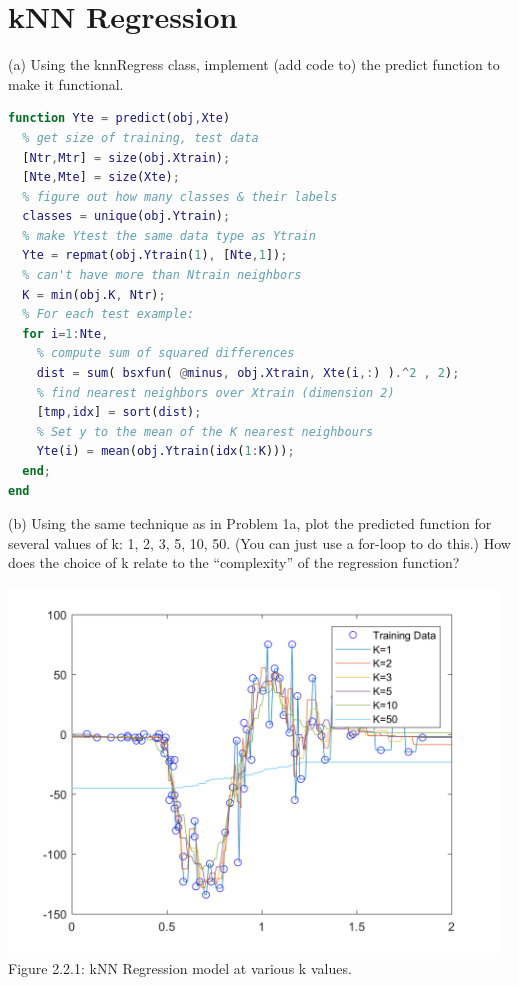 \documentclass[]{report}   %
\begin{document}
\section{kNN Regression}
(a) Using the knnRegress class, implement (add code to) the predict function to make it functional.
\begin{lstlisting}[language=Matlab, caption=predict() Implementation]
% Test function: predict on Xtest
function Yte = predict(obj,Xte)
  % get size of training, test data
  [Ntr,Mtr] = size(obj.Xtrain);
  [Nte,Mte] = size(Xte);
  % figure out how many classes & their labels
  classes = unique(obj.Ytrain);        
  % make Ytest the same data type as Ytrain  
  Yte = repmat(obj.Ytrain(1), [Nte,1]);  
  % can't have more than Ntrain neighbors
  K = min(obj.K, Ntr);                  
  % For each test example:
  for i=1:Nte,                
    % compute sum of squared differences          
    dist = sum( bsxfun( @minus, obj.Xtrain, Xte(i,:) ).^2 , 2);  
    % find nearest neighbors over Xtrain (dimension 2)
    [tmp,idx] = sort(dist);                                                
    % Set y to the mean of the K nearest neighbours
    Yte(i) = mean(obj.Ytrain(idx(1:K)));   
  end;
end
\end{lstlisting}

(b) Using the same technique as in Problem 1a, plot the predicted function for several values of k: 1, 2, 3, 5, 10, 50. (You can just use a for-loop to do this.) How does the choice of k relate to the “complexity” of the regression function?

\begin{center}
	\includegraphics[width=35em]{2_2_Figure_1.png}
	{Figure 2.2.1: kNN Regression model at various k values.}
\end{center} 
\end{document}

